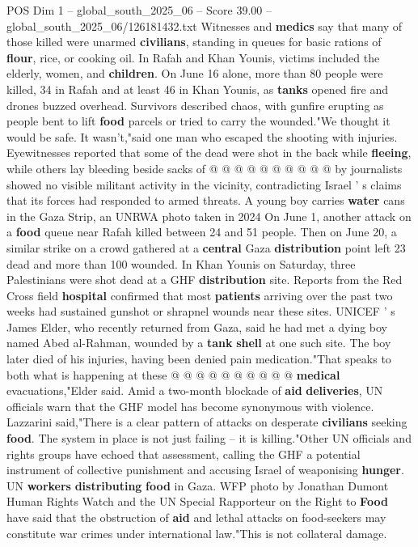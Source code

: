 \begin{textsample}{POS Dim 1 – global\_south\_2025\_06 – Score 39.00 – global\_south\_2025\_06/126181432.txt}
Witnesses and \textbf{medics} say that many of those killed were unarmed \textbf{civilians}, standing in queues for basic rations of \textbf{flour}, rice, or cooking oil.
In Rafah and Khan Younis, victims included the elderly, women, and \textbf{children}.
On June 16 alone, more than 80 people were killed, 34 in Rafah and at least 46 in Khan Younis, as \textbf{tanks} opened fire and drones buzzed overhead.
Survivors described chaos, with gunfire erupting as people bent to lift \textbf{food} parcels or tried to carry the wounded."We thought it would be safe.
It wasn't,"said one man who escaped the shooting with injuries.
Eyewitnesses reported that some of the dead were shot in the back while \textbf{fleeing}, while others lay bleeding beside sacks of @ @ @ @ @ @ @ @ @ @ by journalists showed no visible militant activity in the vicinity, contradicting Israel ' s claims that its forces had responded to armed threats.
A young boy carries \textbf{water} cans in the Gaza Strip, an UNRWA photo taken in 2024 On June 1, another attack on a \textbf{food} queue near Rafah killed between 24 and 51 people.
Then on June 20, a similar strike on a crowd gathered at a \textbf{central} Gaza \textbf{distribution} point left 23 dead and more than 100 wounded.
In Khan Younis on Saturday, three Palestinians were shot dead at a GHF \textbf{distribution} site.
Reports from the Red Cross field \textbf{hospital} confirmed that most \textbf{patients} arriving over the past two weeks had sustained gunshot or shrapnel wounds near these sites.
UNICEF ' s James Elder, who recently returned from Gaza, said he had met a dying boy named Abed al-Rahman, wounded by a \textbf{tank} \textbf{shell} at one such site.
The boy later died of his injuries, having been denied pain medication."That speaks to both what is happening at these @ @ @ @ @ @ @ @ @ @ \textbf{medical} evacuations,"Elder said.
Amid a two-month blockade of \textbf{aid} \textbf{deliveries}, UN officials warn that the GHF model has become synonymous with violence.
Lazzarini said,"There is a clear pattern of attacks on desperate \textbf{civilians} seeking \textbf{food}.
The system in place is not just failing -- it is killing."Other UN officials and rights groups have echoed that assessment, calling the GHF a potential instrument of collective punishment and accusing Israel of weaponising \textbf{hunger}.
UN \textbf{workers} \textbf{distributing} \textbf{food} in Gaza.
WFP photo by Jonathan Dumont Human Rights Watch and the UN Special Rapporteur on the Right to \textbf{Food} have said that the obstruction of \textbf{aid} and lethal attacks on food-seekers may constitute war crimes under international law."This is not collateral damage.

\end{textsample}

